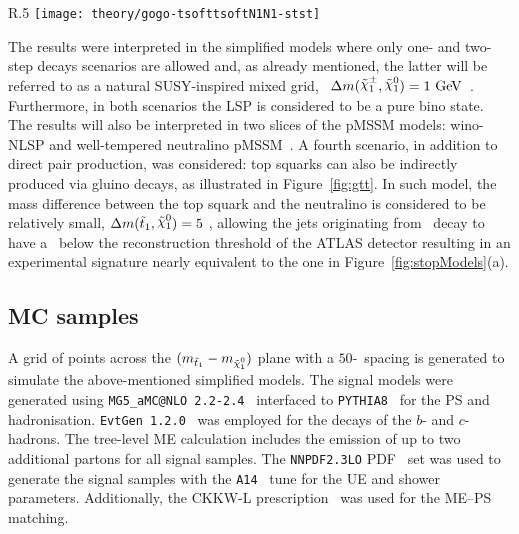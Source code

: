 			\begin{wrapfigure}{R}{.5\textwidth}
				\centering\texttt{[image: theory/gogo-tsofttsoftN1N1-stst]}
				\caption{Diagram of the gluino-mediated top squark production. The term ``soft" refers to decay products whose transverse momenta are below the detector thresholds.}
				\label{fig:gtt}
			\end{wrapfigure}

			The results were interpreted in the simplified models where only one- and two-step decays scenarios are allowed and, as already mentioned, the latter will be referred to as a natural \ac{SUSY}-inspired mixed grid, \ie\ $\Delta m(\chinoonepm, \ninoone) = 1 \GeV$~\cite{Alwall:2008ve, Alwall:2008ag, Alves:2011wf}. Furthermore, in both scenarios the \ac{LSP} is considered to be a pure bino state. The results will also be interpreted in two slices of the \ac{pMSSM} models: wino-\ac{NLSP} and well-tempered neutralino \ac{pMSSM}~\cite{Djouadi:1998di, Berger:2008cq}.
			A fourth scenario, in addition to direct pair production, was considered: top squarks can also be indirectly produced via gluino decays, as illustrated in Figure~\ref{fig:gtt}. In such model, the mass difference between the top squark and the neutralino is considered to be relatively small, $\Delta m(\stopone, \ninoone) = 5$ \GeV, allowing the jets originating from \stopone\ decay to have a \pt\ below the reconstruction threshold of the \ac{ATLAS} detector resulting in an experimental signature nearly equivalent to the one in Figure~\ref{fig:stopModels}(a).


		\subsection{MC samples}

			A grid of points across the $(\mstopone-\mninoone)$ plane with a $50$-\GeV\ spacing is generated to simulate the above-mentioned simplified models. %
			The signal models were generated using \texttt{MG5\_aMC@NLO 2.2-2.4}~\cite{madgraph} interfaced to \texttt{PYTHIA8}~\cite{pythia8} for the \ac{PS} and hadronisation. \texttt{EvtGen 1.2.0}~\cite{evtGen} was employed for the decays of the  $b$- and $c$-hadrons. The tree-level \ac{ME} calculation includes the emission of up to two additional partons for all signal samples. The \texttt{NNPDF2.3LO} \ac{PDF}~\cite{PDFs} set was used to generate the signal samples with the \texttt{A14}~\cite{CT10} tune for the \ac{UE} and shower parameters. Additionally, the CKKW-L prescription~\cite{CKKW} was used for the \ac{ME}–\ac{PS} matching. 

